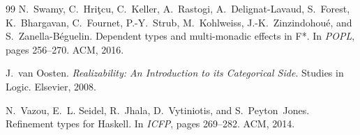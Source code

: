 \documentclass[11pt]{article}
\begin{document}
\begin{thebibliography}{99}
N.~Swamy, C.~Hri\c{t}cu, C.~Keller, A.~Rastogi, A.~Delignat-Lavaud,
  S.~Forest, K.~Bhargavan, C.~Fournet, P.-Y.~Strub, M.~Kohlweiss,
  J.-K.~Zinzindohou\'{e}, and S.~Zanella-B\'{e}guelin.
\newblock Dependent types and multi-monadic effects in {F*}.
\newblock In \emph{POPL}, pages 256--270. ACM, 2016.

J.~van Oosten.
\newblock \emph{Realizability: An Introduction to its Categorical Side}.
\newblock Studies in Logic. Elsevier, 2008.

N.~Vazou, E.~L. Seidel, R.~Jhala, D.~Vytiniotis, and S.~Peyton~Jones.
\newblock Refinement types for {Haskell}.
\newblock In \emph{ICFP}, pages 269--282. ACM, 2014.

\end{thebibliography}
\end{document}
